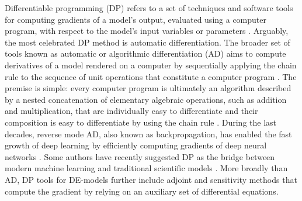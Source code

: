 Differentiable programming (DP) refers to a set of techniques and software tools for computing gradients of a model's output, evaluated using a computer program, with respect to the model's input variables or parameters \cite{Shen_diff_modelling, Innes_Zygote, blondel2024elements}.
Arguably, the most celebrated DP method is automatic differentiation.
The broader set of tools known as automatic or algorithmic differentiation (AD) aims to compute derivatives of a model rendered on a computer by sequentially applying the chain rule to the sequence of unit operations that constitute a computer program \cite{Griewank:2008kh, Naumann.2011}. 
The premise is simple: every computer program is ultimately an algorithm described by a nested concatenation of elementary algebraic operations, such as addition and multiplication, that are individually easy to differentiate and their composition is easy to differentiate by using the chain rule \cite{Giering:1998in}. 
During the last decades, reverse mode AD, also known as backpropagation, has enabled the fast growth of deep learning by efficiently computing gradients of deep neural networks \cite{griewank2012invented}.
Some authors have recently suggested DP as the bridge between modern machine learning and traditional scientific models \cite{Ramsundar_Krishnamurthy_Viswanathan_2021, Shen_diff_modelling, Gelbrecht-differential-programming-Earth, rackauckas2021generalized}. 
More broadly than AD, DP tools for DE-models further include adjoint and sensitivity methods that compute the gradient by relying on an auxiliary set of differential equations.


